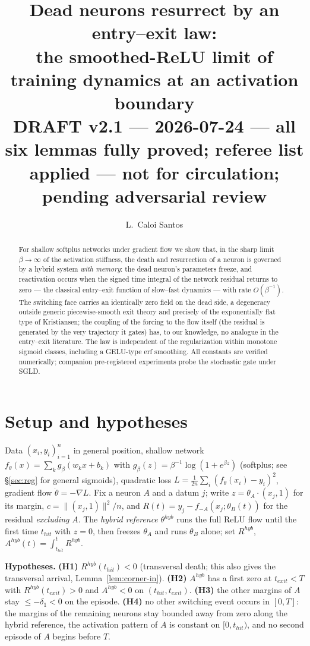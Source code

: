 \documentclass[11pt]{article}
\title{Dead neurons resurrect by an entry--exit law:\\ the smoothed-ReLU limit of
training dynamics at an activation boundary\\ \large DRAFT v2.1 --- 2026-07-24 --- all six lemmas fully proved; referee list applied ---
not for circulation; pending adversarial review}
\author{L.~Caloi Santos}
\date{}
\begin{document}
\maketitle

\begin{abstract}
For shallow softplus networks under gradient flow we show that, in the sharp
limit $\beta\to\infty$ of the activation stiffness, the death and resurrection
of a neuron is governed by a hybrid system \emph{with memory}: the dead
neuron's parameters freeze, and reactivation occurs when the signed time
integral of the network residual returns to zero --- the classical entry--exit
function of slow--fast dynamics --- with rate $O(\beta^{-1})$. The switching
face carries an identically zero field on the dead side, a degeneracy outside
generic piecewise-smooth exit theory and precisely of the exponentially flat
type of Kristiansen; the coupling of the forcing to the flow itself
(the residual is generated by the very trajectory it gates) has, to our
knowledge, no analogue in the entry--exit literature. The law is independent
of the regularization within monotone sigmoid classes, including a GELU-type erf smoothing. All constants are verified numerically;
companion pre-registered experiments probe the stochastic gate under SGLD.
\end{abstract}

\section{Setup and hypotheses}
Data $(x_i,y_i)_{i=1}^n$ in general position, shallow network
$f_\theta(x)=\sum_k g_\beta(w_kx+b_k)$ with $g_\beta(z)=\beta^{-1}\log(1+e^{\beta z})$
(softplus; see \S\ref{sec:reg} for general sigmoids), quadratic loss
$L=\tfrac1{2n}\sum_i(f_\theta(x_i)-y_i)^2$, gradient flow $\dot\theta=-\nabla L$.
Fix a neuron $A$ and a datum $j$; write $z=\theta_A\cdot(x_j,1)$ for its margin,
$c=\|(x_j,1)\|^2/n$, and $R(t)=y_j-f_{-A}(x_j;\theta_B(t))$ for the residual
\emph{excluding} $A$. The \emph{hybrid reference} $\theta^{hyb}$ runs the full
ReLU flow until the first time $t_{hit}$ with $z=0$, then freezes $\theta_A$ and
runs $\theta_B$ alone; set $R^{hyb}$, $A^{hyb}(t)=\int_{t_{hit}}^t R^{hyb}$.

\smallskip\noindent\textbf{Hypotheses.}
\textbf{(H1)} $R^{hyb}(t_{hit})<0$ (transversal death; this also gives the
transversal arrival, Lemma~\ref{lem:corner-in}).
\textbf{(H2)} $A^{hyb}$ has a first zero at $t_{exit}<T$ with
$R^{hyb}(t_{exit})>0$ and $A^{hyb}<0$ on $(t_{hit},t_{exit})$.
\textbf{(H3)} the other margins of $A$ stay $\le-\delta_1<0$ on the episode.
\textbf{(H4)} no other switching event occurs in $[0,T]$: the margins of the
remaining neurons stay bounded away from zero along the hybrid reference, the
activation pattern of $A$ is constant on $[0,t_{hit})$, and no second episode
of $A$ begins before $T$.
\end{document}
